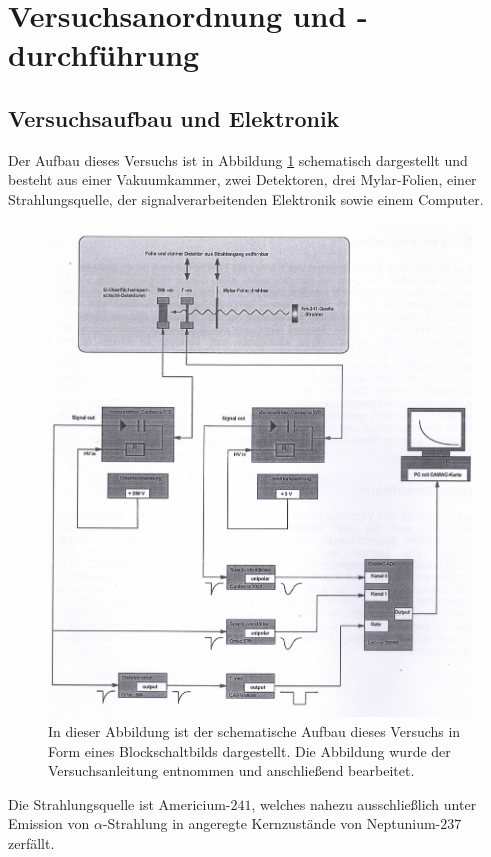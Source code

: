 \section{Versuchsanordnung und -durchführung}

\subsection{Versuchsaufbau und Elektronik}

Der Aufbau dieses Versuchs ist in Abbildung \ref{Aufbau} schematisch dargestellt und besteht aus einer Vakuumkammer, zwei Detektoren, drei Mylar-Folien, einer Strahlungsquelle, der signalverarbeitenden Elektronik sowie einem Computer.
\begin{figure}[H]
	\centering
	\includegraphics[width=1.0\textwidth]{img/Aufbau}
	\caption{In dieser Abbildung ist der schematische Aufbau dieses Versuchs in Form eines Blockschaltbilds dargestellt. Die Abbildung wurde der Versuchsanleitung\cite{wwu} entnommen und anschließend bearbeitet.}
	\label{Aufbau}
\end{figure}
\noindent Die Strahlungsquelle ist Americium-$241$, welches nahezu ausschließlich unter Emission von $\alpha$-Strahlung in angeregte Kernzustände von Neptunium-$237$ zerfällt.
